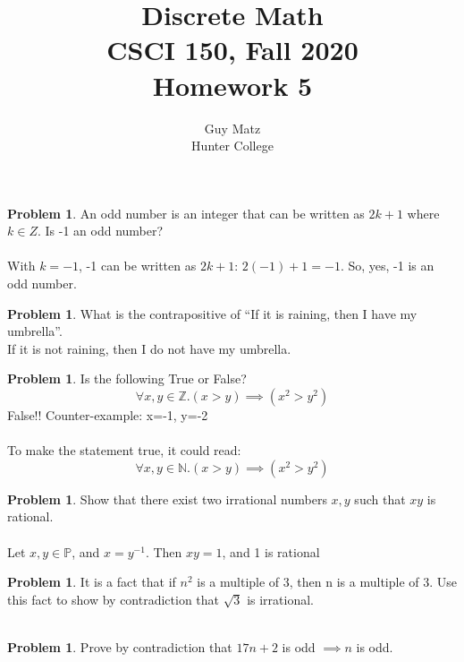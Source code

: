 \documentclass[10pt,leqno ]{article}
\title{Discrete Math\\
CSCI 150, Fall 2020\\
Homework 5}
\author{Guy Matz \\
Hunter College}
\theoremstyle{definition}
\newtheorem{problem}[theorem]{Problem}
\begin{document}
\begin{problem} An odd number is an integer that can be written as $2k + 1$ where $k \in Z$.  Is -1 an odd number?
\\\\
\Large
With $k=-1$, -1 can be written as $2k + 1$: $2(-1) + 1 = -1$.  So, yes, -1 is an odd number.

\end{problem}
\newpage

\begin{problem} What is the contrapositive of “If it is raining, then I have my umbrella”.
\\
\Large
If it is not raining, then I do not have my umbrella.
\end{problem}
\newpage

\begin{problem} Is the following True or False?
$$ \forall x, y \in  \mathbb{Z}.(x > y) \implies (x^2 > y^2)$$
\Large
False!!  Counter-example: x=-1, y=-2
\\\\
To make the statement true, it could read:
$$ \forall x, y \in  \mathbb{N}.(x > y) \implies (x^2 > y^2)$$
\end{problem}
\newpage

\begin{problem} Show that there exist two irrational numbers $x, y$ such that $xy$ is rational.
\\\\
\Large
Let $x,y \in \mathbb{P}$, and $x = y^{-1}$.  Then $xy = 1$, and 1 is rational
\end{problem}
\newpage

\begin{problem} It is a  fact that if $n^2$ is a multiple of 3, then n is
a multiple of 3. Use this fact to show by contradiction that $\sqrt{3}$  is irrational.
\\\\
\Large

\end{problem}
\newpage

\begin{problem} Prove by contradiction that $17n + 2$ is odd $\implies n$ is odd.
\\\\
\Large

\end{problem}
\newpage
\end{document}
